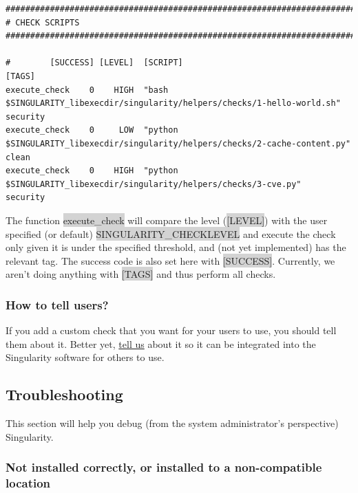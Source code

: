 \documentclass[a4paper]{article}
\begin{document}
\begin{lstlisting}[frame=single]
##################################################################################
# CHECK SCRIPTS
##################################################################################

#        [SUCCESS] [LEVEL]  [SCRIPT]                                                                         [TAGS]
execute_check    0    HIGH  "bash $SINGULARITY_libexecdir/singularity/helpers/checks/1-hello-world.sh"       security
execute_check    0     LOW  "python $SINGULARITY_libexecdir/singularity/helpers/checks/2-cache-content.py"   clean
execute_check    0    HIGH  "python $SINGULARITY_libexecdir/singularity/helpers/checks/3-cve.py"             security

\end{lstlisting}

The function \colorbox{lightgray}{execute\_check} will compare the level (\colorbox{lightgray}{[LEVEL]}) with the user specified (or default) \colorbox{lightgray}{SINGULARITY\_CHECKLEVEL} and execute the check only given it is under the specified threshold, and (not yet implemented) has the relevant tag. The success code is also set here with \colorbox{lightgray}{[SUCCESS]}. Currently, we aren’t doing anything with \colorbox{lightgray}{[TAGS]} and thus perform all checks.

\subsubsection{How to tell users?}

If you add a custom check that you want for your users to use, you should tell them about it. Better yet, \href{https://github.com/singularityware/singularity/issues}{tell us}  about it so it can be integrated into the Singularity software for others to use.

\subsection{Troubleshooting}

This section will help you debug (from the system administrator’s perspective) Singularity.

\subsubsection{Not installed correctly, or installed to a non-compatible location}
\end{document}
